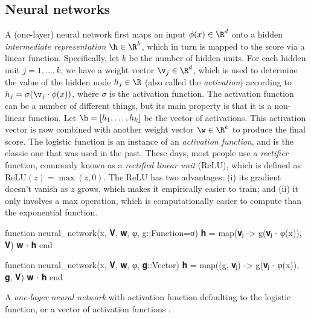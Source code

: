 \subsection{Neural networks}
A (one-layer) neural network first maps an input $\phi(x) \in \R^d$ onto a hidden \textit{intermediate representation} $\h \in \R^k$,
%
which in turn is mapped to the score via a linear function.
%
Specifically, let $k$ be the number of hidden units.
%
For each hidden unit $j = 1, \dots, k$, we have a weight vector $\v_j \in \R^d$,
%
which is used to determine the value of the hidden node $h_j \in \R$ (also called the \textit{activation})
%
according to $h_j = \sigma(\v_j \cdot \phi(x))$, where $\sigma$ is the activation function.
%
The activation function can be a number of different things, but its main property is that it is a non-linear function.
%
Let $\h = [h_1, \dots, h_k]$ be the vector of activations.
%
This activation vector is now combined with another weight vector $\w \in \R^k$ to produce the final score.
%
The logistic function is an instance of an \textit{activation function},
%
and is the classic one that was used in the past.
%
These days, most people use a \textit{rectifier} function, commonly known as a \textit{rectified linear unit} (ReLU),
%
which is defined as $\text{ReLU}(z) = \max(z, 0)$.
%
The ReLU has two advantages: (i) its gradient doesn't vanish as $z$ grows, which makes it empirically easier to train;
%
and (ii) it only involves a max operation, which is computationally easier to compute than the exponential function.
\begin{algorithm}
\begin{juliaverbatim}
function neural_network(x, 𝐕, 𝐰, φ, g::Function=σ)
    𝐡 = map(𝐯ⱼ -> g(𝐯ⱼ ⋅ φ(x)), 𝐕)
    𝐰 ⋅ 𝐡
end

function neural_network(x, 𝐕, 𝐰, φ, 𝐠::Vector)
    𝐡 = map((g, 𝐯ⱼ) -> g(𝐯ⱼ ⋅ φ(x)), 𝐠, 𝐕)
    𝐰 ⋅ 𝐡
end
\end{juliaverbatim}
\caption{
	\label{alg:neural_network}
	A \textit{one-layer neural network} with activation function  defaulting to the logistic function, or a vector of activation functions .
}
\end{algorithm}

